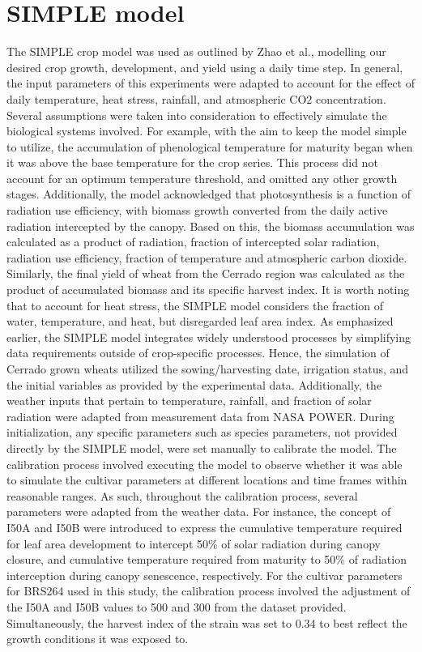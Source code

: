 \documentclass[11pt]{article}
\begin{document}
\section{SIMPLE model}
\label{sec:org1c48560}
The SIMPLE crop model was used as outlined by Zhao et al., modelling our desired crop growth, development, and yield using a daily time step. In general, the input parameters of this experiments were adapted to account for the effect of daily temperature, heat stress, rainfall, and atmospheric CO2 concentration. Several assumptions were taken into consideration to effectively simulate the biological systems involved. 
For example, with the aim to keep the model simple to utilize, the accumulation of phenological temperature for maturity began when it was above the base temperature for the crop series. This process did not account for an optimum temperature threshold, and omitted any other growth stages. Additionally, the model acknowledged that photosynthesis is a function of radiation use efficiency, with biomass growth converted from the daily active radiation intercepted by the canopy. Based on this, the biomass accumulation was calculated as a product of radiation, fraction of intercepted solar radiation, radiation use efficiency, fraction of temperature and atmospheric carbon dioxide. Similarly, the final yield of wheat from the Cerrado region was calculated as the product of accumulated biomass and its specific harvest index. It is worth noting that to account for heat stress, the SIMPLE model considers the fraction of water, temperature, and heat, but disregarded leaf area index.
As emphasized earlier, the SIMPLE model integrates widely understood processes by simplifying data requirements outside of crop-specific processes. Hence, the simulation of Cerrado grown wheats utilized the sowing/harvesting date, irrigation status, and the initial variables as provided by the experimental data. Additionally, the weather inputs that pertain to temperature, rainfall, and fraction of solar radiation were adapted from measurement data from NASA POWER. During initialization, any specific parameters such as species parameters, not provided directly by the SIMPLE model, were set manually to calibrate the model. 
The calibration process involved executing the model to observe whether it was able to simulate the cultivar parameters at different locations and time frames within reasonable ranges. As such, throughout the calibration process, several parameters were adapted from the weather data. For instance, the concept of I50A and I50B were introduced to express the cumulative temperature required for leaf area development to intercept 50\% of solar radiation during canopy closure, and cumulative temperature required from maturity to 50\% of radiation interception during canopy senescence, respectively. For the cultivar parameters for BRS264 used in this study, the calibration process involved the adjustment of the I50A and I50B values to 500 and 300 from the dataset provided. Simultaneously, the harvest index of the strain was set to 0.34 to best reflect the growth conditions it was exposed to. 
\end{document}
